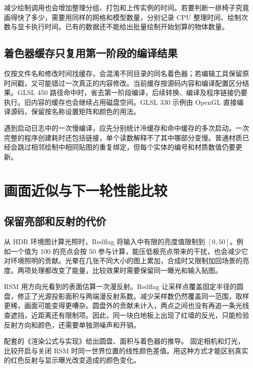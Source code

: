 减少绘制调用也会增加整理分组、打包和上传实例的时间。若要判断一排椅子究竟画得快了多少，需要用同样的网格和模型数量，分别记录 CPU 整理时间、绘制次数与显卡执行时间。已有的数据还不能给出批量绘制开始划算的物体数量。

\subsection{着色器缓存只复用第一阶段的编译结果}
仅按文件名和修改时间找缓存，会混淆不同目录的同名着色器；若编辑工具保留原时间戳，又可能错过一次真正的内容修改。当前缓存按源码内容和编译配置区分结果。GLSL 450 路径命中时，省去第一阶段编译，后续转换、编译及程序链接仍要执行。旧内容的缓存也会继续占用磁盘空间。GLSL 330 示例由 OpenGL 直接编译源码，保留按名称设置矩阵和颜色的用法。

遇到启动日志中的一次慢编译，应先分别统计冷缓存和命中缓存的多次启动。一次完整的程序创建耗时还包括链接，单个读数解释不了其中哪部分变慢。普通材质已经会跳过相邻绘制中相同贴图的重复绑定，但每个实体的编号和材质数值仍要更新。

\newpage

\newpage


\newpage
\section{画面近似与下一轮性能比较}
\subsection{保留亮部和反射的代价}
从 HDR 环境图计算光照时，Redflag 将输入中有限的亮度值限制到 $[0,50]$。例如一个值为 100 的亮点会按 50 参与计算，能压低极亮点带来的干扰，也会减少它对环境照明的贡献。光晕在几张不同大小的图上累加，合成时又限制加回场景的亮度。两项处理都改变了能量，比较效果时需要保留同一曝光和输入贴图。

RSM 用方向光看到的表面估算一次漫反射。Redflag 让采样点覆盖固定半径的圆盘，修正了光源投影面积与两端漫反射系数。减少采样数仍然覆盖同一范围，取样更稀，画面可能变得更嘈杂。圆盘外的贡献未计入，两点之间也没有再追一条光线查遮挡，近距离还有限制项。因此，同一块白地板上出现了红墙的反光，只能检验反射方向和颜色，还需要单独测噪声和开销。

配套的《渲染公式与实现》给出圆盘、面积与着色器的推导。 固定相机和灯光，比较开启与关闭 RSM 时同一世界位置的线性颜色差值。用这种方式才能区别真实的红色反射与显示曝光改变造成的颜色变化。

